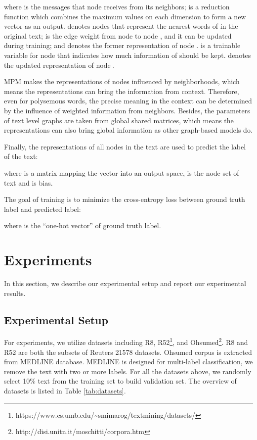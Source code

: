 \documentclass[11pt,a4paper]{article}
\begin{document}
where  is the messages that node  receives from its neighbors;  is a reduction function which combines the maximum values on each dimension to form a new vector as an output.   denotes nodes that represent the nearest  words of  in the original text;  is the edge weight from node  to node , and it can be updated during training; and  denotes the former representation of node .   is a trainable variable for node  that indicates how much information of   should be kept.  denotes the updated representation of node .



MPM makes the representations of nodes influenced by neighborhoods, which means the representations can bring the information from context. Therefore, even for polysemous words, the precise meaning in the context can be determined by the influence of weighted information from neighbors. Besides, the parameters of text level graphs are taken from global shared matrices, which means the representations can also bring global information as other graph-based models do. 

Finally, the representations of all nodes in the text are used to predict the label of the text:

where  is a matrix mapping the vector into an output space,  is the node set of text  and  is bias. 

The goal of training is to minimize the cross-entropy loss between ground truth label and predicted label:

where  is the ``one-hot vector'' of ground truth label.

\section{Experiments}\label{sec:exp_setup}
In this section, we describe our experimental setup and report our experimental results.
\subsection{Experimental Setup}



For experiments, we utilize datasets including R8, R52\footnote{https://www.cs.umb.edu/\~{}smimarog/textmining/datasets/}, and  Ohsumed\footnote{http://disi.unitn.it/moschitti/corpora.htm}.
R8 and R52 are both the subsets of Reuters 21578 datasets. Ohsumed corpus is extracted from MEDLINE database. MEDLINE is designed for multi-label classification, we remove the text with two or more labels. For all the datasets above, we randomly select 10\% text from the training set to build validation set.  The overview of datasets is listed in Table \ref{tab:datasets}.
\end{document}
